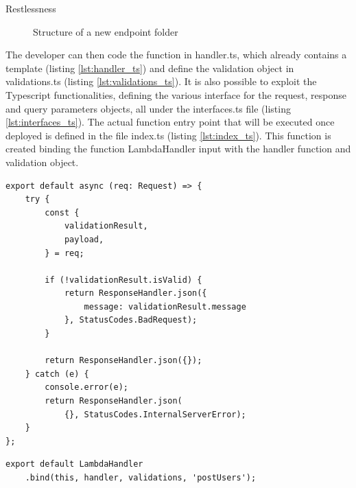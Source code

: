 \begin{chapter}{Restlessness}
    \begin{figure}
        \begin{minipage}{\linewidth}
        \end{minipage}
        \caption{Structure of a new endpoint folder}
        \label{fig:new_endpoint_folder_structure}
    \end{figure}

    The developer can then code the function in handler.ts, which already contains a
    template (listing \ref{lst:handler_ts}) and define the validation object in
    validations.ts (listing \ref{lst:validations_ts}).
    It is also possible to exploit the Typescript functionalities, defining the various
    interface for the request, response and query parameters objects, all under the
    interfaces.ts file (listing \ref{lst:interfaces_ts}).
    The actual function entry point that will be executed once deployed is defined
    in the file index.ts (listing \ref{lst:index_ts}). This function is created binding
    the function LambdaHandler input with the handler function and validation object.

    \clearpage

    \begin{lstlisting}[caption=handler.ts content, label={lst:handler_ts}]
export default async (req: Request) => {
    try {
        const {
            validationResult,
            payload,
        } = req;

        if (!validationResult.isValid) {
            return ResponseHandler.json({
                message: validationResult.message
            }, StatusCodes.BadRequest);
        }

        return ResponseHandler.json({});
    } catch (e) {
        console.error(e);
        return ResponseHandler.json(
            {}, StatusCodes.InternalServerError);
    }
};
    \end{lstlisting}

    \bigskip
    \begin{lstlisting}[caption=index.ts content, label={lst:index_ts}]
export default LambdaHandler
    .bind(this, handler, validations, 'postUsers');
    \end{lstlisting}


\end{chapter}
